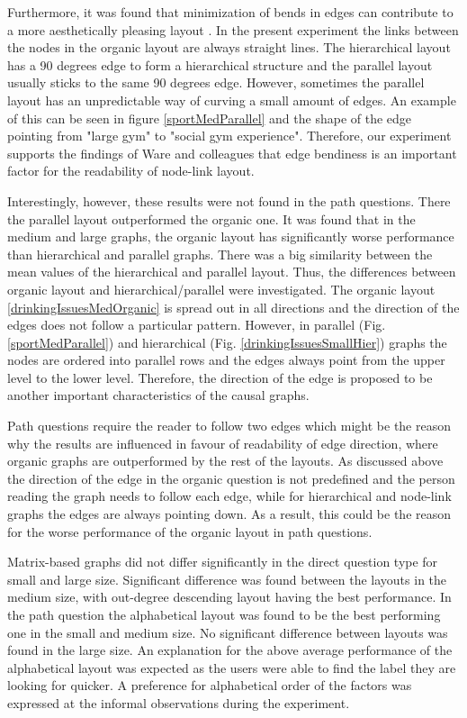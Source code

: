 \documentclass{l4proj}
\begin{document}
Furthermore, it was found that minimization of bends in edges can contribute to a more aesthetically pleasing layout \cite{ware2002cognitive}. In the present experiment the links between the nodes in the organic layout are always straight lines. The hierarchical layout has a 90 degrees edge to form a hierarchical structure and the parallel layout usually sticks to the same 90 degrees edge. However, sometimes the parallel layout has an unpredictable way of curving a small amount of edges. An example of this can be seen in figure \ref{sportMedParallel} and the shape of the edge pointing from "large gym" to "social gym experience". Therefore, our experiment supports the findings of Ware and colleagues \cite{ware2002cognitive} that edge bendiness is an important factor for the readability of node-link layout.

Interestingly, however, these results were not found in the path questions. There the parallel layout outperformed the organic one. It was found that in the medium and large graphs, the organic layout has significantly worse performance than hierarchical and parallel graphs. There was a big similarity between the mean values of the hierarchical and parallel layout. Thus, the differences between organic layout and hierarchical/parallel were investigated. The organic layout \ref{drinkingIssuesMedOrganic} is spread out in all directions and the direction of the edges does not follow a particular pattern. However, in parallel (Fig. \ref{sportMedParallel}) and hierarchical (Fig. \ref{drinkingIssuesSmallHier}) graphs the nodes are ordered into parallel rows and the edges always point from the upper level to the lower level. Therefore, the direction of the edge is proposed to be another important characteristics of the causal graphs. 

Path questions require the reader to follow two edges which might be the reason why the results are influenced in favour of readability of edge direction, where organic graphs are outperformed by the rest of the layouts. As discussed above the direction of the edge in the organic question is not predefined and the person reading the graph needs to follow each edge, while for hierarchical and node-link graphs the edges are always pointing down. As a result, this could be the reason for the worse performance of the organic layout in path questions.

Matrix-based graphs did not differ significantly in the direct question type for small and large size. Significant difference was found between the layouts in the medium size, with out-degree descending layout having the best performance. In the path question the alphabetical layout was found to be the best performing one in the small and medium size. No significant difference between layouts was found in the large size. An explanation for the above average performance of the alphabetical layout was expected as the users were able to find the label they are looking for quicker. A preference for alphabetical order of the factors was expressed at the informal observations during the experiment.
\end{document}
